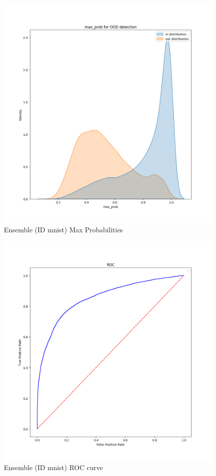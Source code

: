 \documentclass[11pt]{article}
\begin{document}
\begin{figure}[htbp]
\centering
\includegraphics[width=.9\linewidth]{./ens_mnist_max_prob.png}
\caption{\label{fig:org270c432}
Ensemble (ID mnist) Max Probabilities}
\end{figure}

\begin{figure}[htbp]
\centering
\includegraphics[width=.9\linewidth]{./ens_mnist_roc.png}
\caption{\label{fig:org9599962}
Ensemble (ID mnist) ROC curve}
\end{figure}
\end{document}
